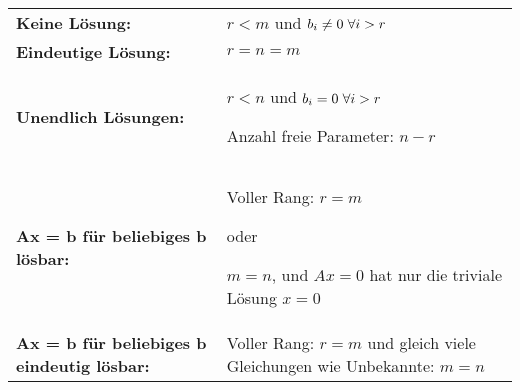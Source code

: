 {


\vspace{-3mm}

\renewcommand{\arraystretch}{2}
\setlength{\tabcolsep}{3pt}
\begin{tabular}{@{} p{2.4cm} p{4.1cm}}
\textbf{Keine Lösung:} & $r < m$ und $b_{i} \neq 0 \hskip3pt \forall i > r$ \\
\textbf{Eindeutige Lösung:} & $r = n = m$ \\
\textbf{Unendlich Lösungen:} & $r < n$ und $b_{i} = 0 \hskip3pt \forall i > r$ \par Anzahl freie Parameter: $n - r$ \\
\textbf{Ax = b für beliebiges b lösbar:} & Voller Rang: $r = m$ \par oder \par $m = n$, und  $Ax = 0$ hat nur die triviale Lösung $x = 0$ \\
\textbf{Ax = b für beliebiges b eindeutig lösbar:} & Voller Rang: $r = m$ und gleich viele Gleichungen wie Unbekannte: $m =n$
\end{tabular}
\vspace{-1mm}
}
\WhiteSpace